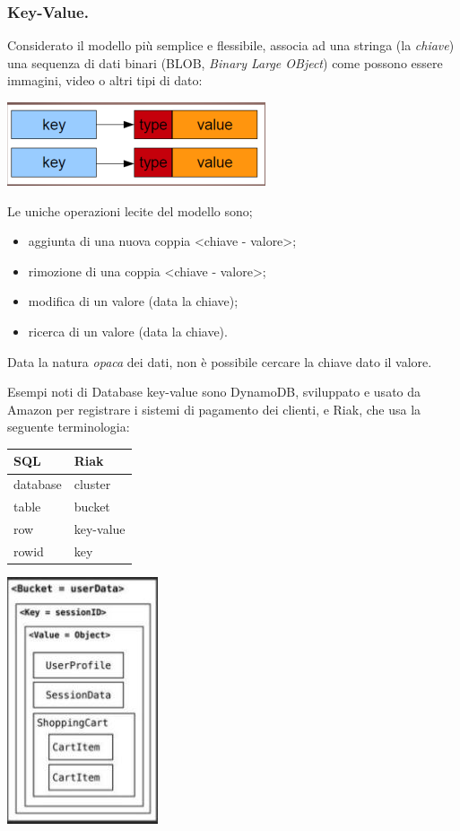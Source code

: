 \documentclass[a4page, 11pt]{article}
\begin{document}
\subsubsection{Key-Value.}
Considerato il modello più semplice e flessibile, associa ad una stringa (la \textit{chiave}) una sequenza di dati binari (BLOB, \textit{Binary Large OBject}) come possono essere immagini, video o altri tipi di dato:
\begin{center}
  \includegraphics[scale=0.5]{IMAGE3.jpg}
\end{center}
Le uniche operazioni lecite del modello sono;
\begin{itemize}
\item aggiunta di una nuova coppia \textless{}chiave - valore\textgreater{};
\item rimozione di una coppia \textless{}chiave - valore\textgreater{};
\item modifica di un valore (data la chiave);
\item ricerca di un valore (data la chiave).
\end{itemize}
Data la natura \textit{opaca} dei dati, non è possibile cercare la chiave dato il valore.

Esempi noti di Database key-value sono DynamoDB, sviluppato e usato da Amazon per registrare i sistemi di pagamento dei clienti, e Riak, che usa la seguente terminologia:
\begin{center}
  \begin{minipage}[b]{0.4\textwidth}
    \begin{tabular}{|l|l|}
      \hline
      \textbf{SQL} & \textbf{Riak}\\ \hline
      database & cluster \\ \hline
      table & bucket \\ \hline
      row & key-value\\ \hline
      rowid & key\\ \hline
    \end{tabular}
  \end{minipage}
  \begin{minipage}{.5\textwidth}\centering
    \includegraphics[scale=0.6]{IMAGE4.jpg}
  \end{minipage}
\end{center}
\end{document}
